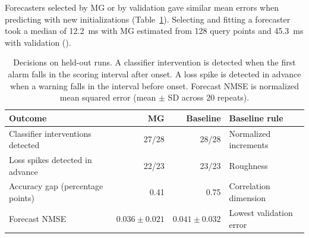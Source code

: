 Forecasters selected by MG or by validation gave similar mean errors when predicting  with new initializations (Table~\ref{tab:decisions}). Selecting and fitting a forecaster took a median of 12.2~ms with MG estimated from 128 query points and 45.3~ms with validation ().

\begin{table}[!htbp]
\centering\small
\caption{Decisions on held-out runs. A classifier intervention is detected when the first alarm falls in the scoring interval after onset. A loss spike is detected in advance when a warning falls in the interval before onset. Forecast NMSE is normalized mean squared error (mean $\pm$ SD across 20 repeats).}
\label{tab:decisions}
\begin{tabularx}{\linewidth}{@{}>{\raggedright\arraybackslash}Xrrl@{}}
\toprule
Outcome & MG & Baseline & Baseline rule \\
\midrule
Classifier interventions detected & 27/28 & 28/28 & Normalized increments \\
Loss spikes detected in advance & 22/23 & 23/23 & Roughness \\
Accuracy gap (percentage points) & 0.41 & 0.75 & Correlation dimension \\
Forecast NMSE & $0.036\pm0.021$ & $0.041\pm0.032$ & Lowest validation error \\
\bottomrule
\end{tabularx}
\end{table}
